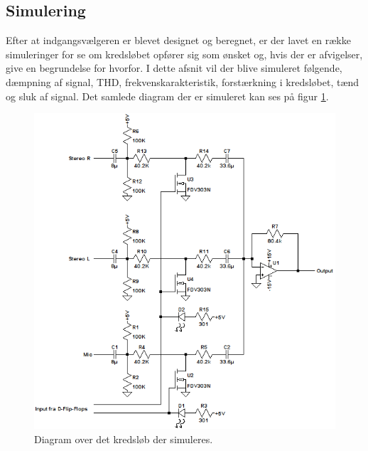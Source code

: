 \subsection{Simulering}
Efter at indgangsvælgeren er blevet designet og beregnet, er der lavet en række simuleringer for se om kredsløbet opfører sig som ønsket og, hvis der er afvigelser, give en begrundelse for hvorfor. I dette afsnit vil der blive simuleret følgende, dæmpning af signal, THD, frekvenskarakteristik, forstærkning i kredsløbet, tænd og sluk af signal. Det samlede diagram der er simuleret kan ses på figur \ref{diagram_simulering}. 

\begin{figure}[h]
\centering
\includegraphics[scale=0.8]{teknisk/indgangsvaelger/simulering/indgangvaelger_ltspice_diagram.png}
\caption{Diagram over det kredsløb der simuleres.}
\label{diagram_simulering}
\end{figure}

